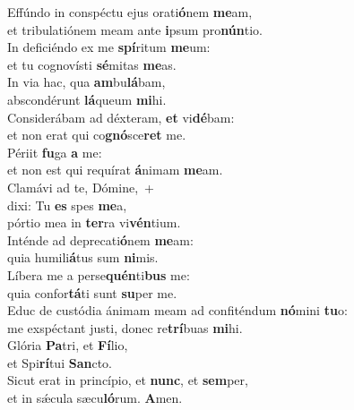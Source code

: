 \evenverse Effúndo in conspéctu ejus orati\textbf{ó}nem \textbf{me}am,~\*\\
\evenverse et tribulatiónem meam ante \textbf{i}psum pro\textbf{nún}tio.\\
\oddverse In deficiéndo ex me \textbf{spí}ritum \textbf{me}um:~\*\\
\oddverse et tu cognovísti \textbf{sé}mitas \textbf{me}as.\\
\evenverse In via hac, qua \textbf{am}bu\textbf{lá}bam,~\*\\
\evenverse abscondérunt \textbf{lá}queum \textbf{mi}hi.\\
\oddverse Considerábam ad déxteram, \textbf{et} vi\textbf{dé}bam:~\*\\
\oddverse et non erat qui co\textbf{gnó}sce\textbf{ret} me.\\
\evenverse Périit \textbf{fu}ga \textbf{a} me:~\*\\
\evenverse et non est qui requírat \textbf{á}nimam \textbf{me}am.\\
\oddverse Clamávi ad te, Dómine,~+\\
\oddverse  dixi: Tu \textbf{es} spes \textbf{me}a,~\*\\
\oddverse pórtio mea in \textbf{ter}ra vi\textbf{vén}tium.\\
\evenverse Inténde ad deprecati\textbf{ó}nem \textbf{me}am:~\*\\
\evenverse quia humili\textbf{á}tus sum \textbf{ni}mis.\\
\oddverse Líbera me a perse\textbf{quén}ti\textbf{bus} me:~\*\\
\oddverse quia confor\textbf{tá}ti sunt \textbf{su}per me.\\
\evenverse Educ de custódia ánimam meam ad confiténdum \textbf{nó}mini \textbf{tu}o:~\*\\
\evenverse me exspéctant justi, donec re\textbf{trí}buas \textbf{mi}hi.\\
\oddverse Glória \textbf{Pa}tri, et \textbf{Fí}lio,~\*\\
\oddverse et Spi\textbf{rí}tui \textbf{San}cto.\\
\evenverse Sicut erat in princípio, et \textbf{nunc}, et \textbf{sem}per,~\*\\
\evenverse et in sǽcula sæcu\textbf{ló}rum. \textbf{A}men.\\
